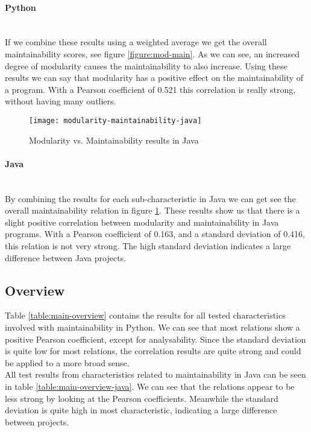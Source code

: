 \documentclass[twoside]{uva-inf-bachelor-thesis}
\newcommand{\myparagraph}[1]{\paragraph{#1}\mbox{}\\}
\begin{document}
\myparagraph{Python}
If we combine these results using a weighted average we get the overall maintainability scores, see figure \ref{figure:mod-main}. As we can see, an increased degree of modularity causes the maintainability to also increase. Using these results we can say that modularity has a positive effect on the maintainability of a program. With a Pearson coefficient of 0.521 this correlation is really strong, without having many outliers.

\begin{figure}[H]
    \caption{Modularity vs. Maintainability results in Java}
    \label{figure:mod-main-java}
    \centering
        \texttt{[image: modularity-maintainability-java]}
\end{figure}

\myparagraph{Java}
By combining the results for each sub-characteristic in Java we can get see the overall maintainability relation in figure \ref{figure:mod-main-java}. These results show us that there is a slight positive correlation between modularity and maintainability in Java programs. With a Pearson coefficient of 0.163, and a standard deviation of 0.416, this relation is not very strong. The high standard deviation indicates a large difference between Java projects.

\subsection{Overview}
Table \ref{table:main-overview} contains the results for all tested characteristics involved with maintainability in Python. We can see that most relations show a positive Pearson coefficient, except for analysability. Since the standard deviation is quite low for most relations, the correlation results are quite strong and could be applied to a more broad sense.\\

All test results from characteristics related to maintainability in Java can be seen in table \ref{table:main-overview-java}. We can see that the relations appear to be less strong by looking at the Pearson coefficients. Meanwhile the standard deviation is quite high in most characteristic, indicating a large difference between projects.
\end{document}
